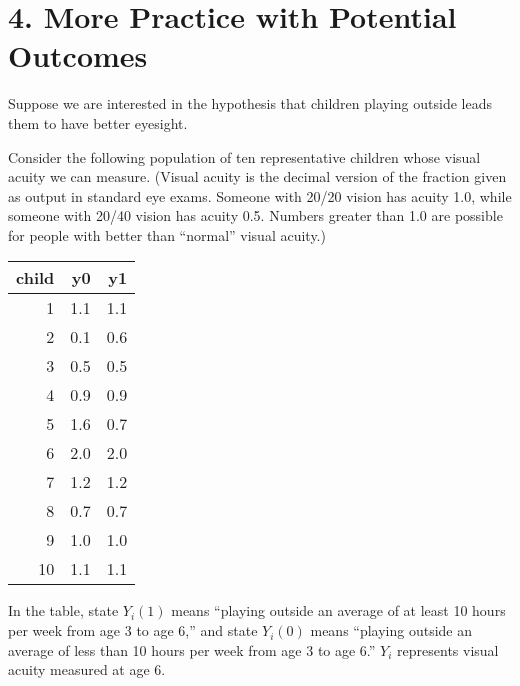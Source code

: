 \documentclass[]{article}
\begin{document}
\section{4. More Practice with Potential
Outcomes}\label{more-practice-with-potential-outcomes}

Suppose we are interested in the hypothesis that children playing
outside leads them to have better eyesight.

Consider the following population of ten representative children whose
visual acuity we can measure. (Visual acuity is the decimal version of
the fraction given as output in standard eye exams. Someone with 20/20
vision has acuity 1.0, while someone with 20/40 vision has acuity 0.5.
Numbers greater than 1.0 are possible for people with better than
``normal'' visual acuity.)

\begin{longtable}[]{@{}rrr@{}}
\toprule
child & y0 & y1\tabularnewline
\midrule
\endhead
1 & 1.1 & 1.1\tabularnewline
2 & 0.1 & 0.6\tabularnewline
3 & 0.5 & 0.5\tabularnewline
4 & 0.9 & 0.9\tabularnewline
5 & 1.6 & 0.7\tabularnewline
6 & 2.0 & 2.0\tabularnewline
7 & 1.2 & 1.2\tabularnewline
8 & 0.7 & 0.7\tabularnewline
9 & 1.0 & 1.0\tabularnewline
10 & 1.1 & 1.1\tabularnewline
\bottomrule
\end{longtable}

In the table, state \(Y_{i}(1)\) means ``playing outside an average of
at least 10 hours per week from age 3 to age 6,'' and state \(Y_{i}(0)\)
means ``playing outside an average of less than 10 hours per week from
age 3 to age 6.'' \(Y_{i}\) represents visual acuity measured at age 6.
\end{document}
